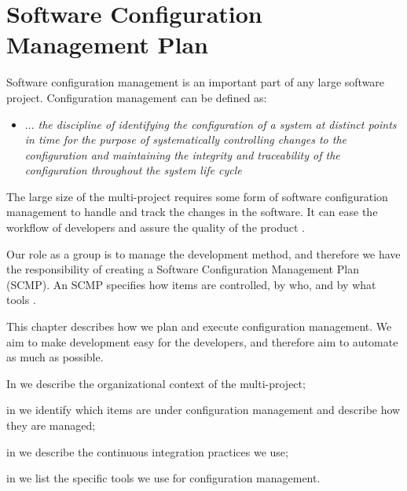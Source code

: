\chapter{Software Configuration Management Plan}\label{chap:sw_intro_cm}
Software configuration management is an important part of any large software project. Configuration management can be defined as:

\begin{itemize}
  \item []\emph{$\ldots{}$ the discipline of identifying the configuration of a system at distinct points in time for the purpose of systematically controlling changes to the configuration and maintaining the integrity and traceability of the configuration throughout the system life cycle} \parencite[ch.6, p.6-1]{swebok}
\end{itemize}

The large size of the multi-project requires some form of software configuration management to handle and track the changes in the software. It can ease the workflow of developers and assure the quality of the product \parencite[ch.6]{swebok}.

Our role as a group is to manage the development method, and therefore we have the responsibility of creating a Software Configuration Management Plan (SCMP). An SCMP specifies how items are controlled, by who, and by what tools \parencite[ch.6]{swebok}.

This chapter describes how we plan and execute configuration management. We aim to make development easy for the developers, and therefore aim to automate as much as possible.

\begin{chapterorganization}
  \item In  we describe the organizational context of the multi-project;
  \item in  we identify which items are under configuration management and describe how they are managed;
  \item in  we describe the continuous integration practices we use;
  \item in  we list the specific tools we use for configuration management.
\end{chapterorganization}

